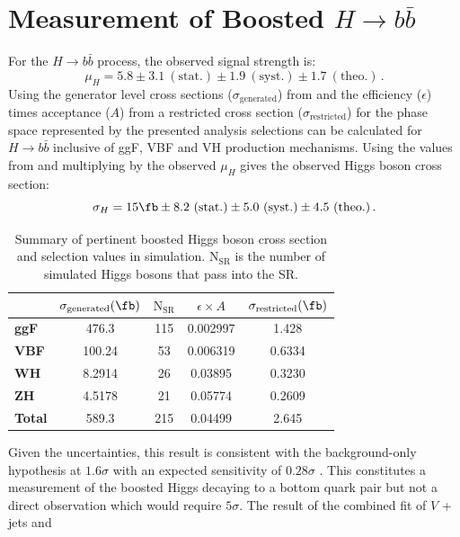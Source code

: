 \section{Measurement of Boosted $H \rightarrow b\bar{b}$} \label{sec:results:procedure}

For the $H \rightarrow b\bar{b}$ process, the observed signal strength is:
%
$$ \mu_{H} = 5.8 \pm 3.1~\mathrm{(stat.)} \pm 1.9~\mathrm{(syst.)} \pm
1.7~\mathrm{(theo.)}\,. $$
%
Using the generator level cross sections ($\sigma_\text{generated}$) from
 and the efficiency ($\epsilon$) times acceptance ($A$)
from  a restricted cross section
($\sigma_\text{restricted}$) for the phase space represented by the presented
analysis selections can be calculated for $H \rightarrow b\bar{b}$ inclusive of
ggF, VBF and VH production mechanisms.  Using the values from
 and multiplying by the observed $\mu_{H}$
gives the observed Higgs boson cross section:
%
$$ \sigma_{H} = 15 \fb \pm 8.2 ~\mathrm{(stat.)} \pm 5.0 ~\mathrm{(syst.)} \pm
4.5 ~\mathrm{(theo.)}\,. $$
%
\begin{table}[!t]
  \centering
  \begin{tabular}{l||c|c|c|c}
     & $ \sigma_\text{generated} (\fb)$ & $\mathrm{N}_\text{SR}$ & $\epsilon \times A$ & $\sigma_\text{restricted} (\fb)$ \\
    \hline
    \hline
    \textbf{ggF}   & 476.3  & 115 & 0.002997 & 1.428 \\
    \textbf{VBF}   & 100.24 & 53  & 0.006319 & 0.6334 \\
    \textbf{WH}    & 8.2914 & 26  & 0.03895  & 0.3230 \\
    \textbf{ZH}    & 4.5178 & 21  & 0.05774  & 0.2609 \\
    \hline
    \textbf{Total} & 589.3  & 215 & 0.04499  & 2.645 \\
  \end{tabular} 
  \caption{Summary of pertinent boosted Higgs boson cross section and selection values in simulation. $\mathrm{N}_\text{SR}$ is the number of simulated Higgs bosons that pass into the SR.}
  \label{tab:results:signal_summary}
\end{table}
%
Given the uncertainties, this result is consistent with the background-only
hypothesis at $1.6\sigma$ with an expected sensitivity of $0.28\sigma$
\cite{Feickert:HiggsCouplings2018}.  This constitutes a measurement of the
boosted Higgs decaying to a bottom quark pair but not a direct observation
which would require $5\sigma$. The result of the combined fit of $V$ + jets and
